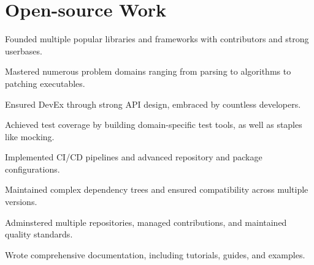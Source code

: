 \section{Open-source Work}
\begin{itemList}
\item Founded multiple popular libraries and frameworks with
  contributors and strong userbases.
\item Mastered numerous problem domains ranging from parsing to
  algorithms to patching executables.
\item Ensured DevEx through strong API design, embraced by countless developers.
\item Achieved test coverage by building domain-specific test tools,
  as well as staples like mocking.
\item Implemented CI/CD pipelines and advanced repository and package
  configurations.
\item Maintained complex dependency trees and ensured compatibility
  across multiple versions.
\item Adminstered multiple repositories, managed contributions, and
  maintained quality standards.
\item Wrote comprehensive documentation, including tutorials, guides,
  and examples.
\end{itemList}
\begin{sectionList}
  
  
\end{sectionList}
